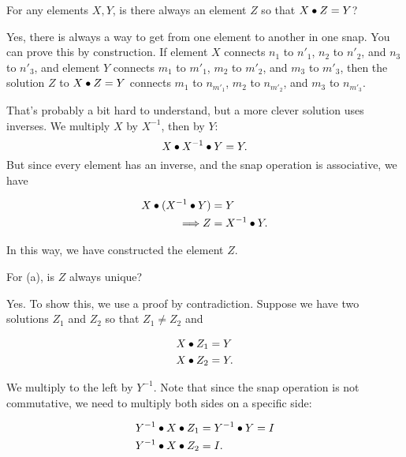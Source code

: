 \documentclass[../gatm_answers.tex]{subfiles}
\begin{document}
\begin{outer_problem}
\item

\begin{inner_problem}[start=1,leftmargin=25pt]
\item For any elements $X, Y$, is there always an element $Z$ so that $X\bullet Z=Y$?
\end{inner_problem}
\end{outer_problem}

\noindent Yes, there is always a way to get from one element to another in one snap. You can prove this by construction. If element $X$ connects $n_1$ to $n'_1$, $n_2$ to $n'_2$, and $n_3$ to $n'_3$, and element $Y$ connects $m_1$ to $m'_1$, $m_2$ to $m'_2$, and $m_3$ to $m'_3$, then the solution $Z$ to $X\bullet Z=Y$ connects $m_1$ to $n_{m'_1}$, $m_2$ to $n_{m'_2}$, and $m_3$ to $n_{m'_3}$.

That's probably a bit hard to understand, but a more clever solution uses inverses. We multiply $X$ by $X^{-1}$, then by $Y$: $$X\bullet X^{-1}\bullet Y = Y.$$ But since every element has an inverse, and the snap operation is associative, we have

\begin{align*}
X\bullet (X^{-1} \bullet Y) &= Y \\
\Longrightarrow Z &= X^{-1} \bullet Y.
\end{align*}

\noindent In this way, we have constructed the element $Z$.

\begin{inner_problem}
	\item For (a), is $Z$ always unique?
\end{inner_problem}

\noindent Yes. To show this, we use a proof by contradiction. Suppose we have two solutions $Z_1$ and $Z_2$ so that $Z_1\neq Z_2$ and

\begin{align*}
X\bullet Z_1 &= Y \\
X\bullet Z_2 &= Y.
\end{align*}

\noindent We multiply to the left by $Y^{-1}$. Note that since the snap operation is not commutative, we need to multiply both sides on a specific side:

\begin{align*}
Y^{-1} \bullet X\bullet Z_1 &= Y^{-1} \bullet Y = I \\
Y^{-1} \bullet X\bullet Z_2 &= I.
\end{align*}
\end{document}
